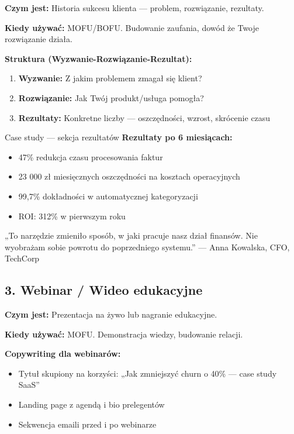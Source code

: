 \documentclass[
  12pt,
  a4paper,
  twoside,
  openright,
  12pt,
  DIV=12,
  BCOR=12mm]{scrbook}
\providecommand{\tightlist}{%
  \setlength{\itemsep}{0pt}\setlength{\parskip}{0pt}}\usepackage{longtable,booktabs,array}
\begin{document}
\textbf{Czym jest:} Historia sukcesu klienta --- problem, rozwiązanie,
rezultaty.

\textbf{Kiedy używać:} MOFU/BOFU. Budowanie zaufania, dowód że Twoje
rozwiązanie działa.

\textbf{Struktura (Wyzwanie-Rozwiązanie-Rezultat):}

\begin{enumerate}
\def\labelenumi{\arabic{enumi}.}
\tightlist
\item
  \textbf{Wyzwanie:} Z jakim problemem zmagał się klient?
\item
  \textbf{Rozwiązanie:} Jak Twój produkt/usługa pomogła?
\item
  \textbf{Rezultaty:} Konkretne liczby --- oszczędności, wzrost,
  skrócenie czasu
\end{enumerate}

\begin{przyklad}{Case study --- sekcja rezultatów}
\textbf{Rezultaty po 6 miesiącach:}
\begin{itemize}
  \item 47\% redukcja czasu procesowania faktur
  \item 23 000 zł miesięcznych oszczędności na kosztach operacyjnych
  \item 99,7\% dokładności w automatycznej kategoryzacji
  \item ROI: 312\% w pierwszym roku
\end{itemize}

„To narzędzie zmieniło sposób, w jaki pracuje nasz dział finansów. Nie wyobrażam sobie powrotu do poprzedniego systemu.” --- Anna Kowalska, CFO, TechCorp
\end{przyklad}

\subsection{3. Webinar / Wideo
edukacyjne}\label{webinar-wideo-edukacyjne}

\textbf{Czym jest:} Prezentacja na żywo lub nagranie edukacyjne.

\textbf{Kiedy używać:} MOFU. Demonstracja wiedzy, budowanie relacji.

\textbf{Copywriting dla webinarów:}

\begin{itemize}
\tightlist
\item
  Tytuł skupiony na korzyści: „Jak zmniejszyć churn o 40\% --- case
  study SaaS''
\item
  Landing page z agendą i bio prelegentów
\item
  Sekwencja emaili przed i po webinarze
\end{itemize}
\end{document}
